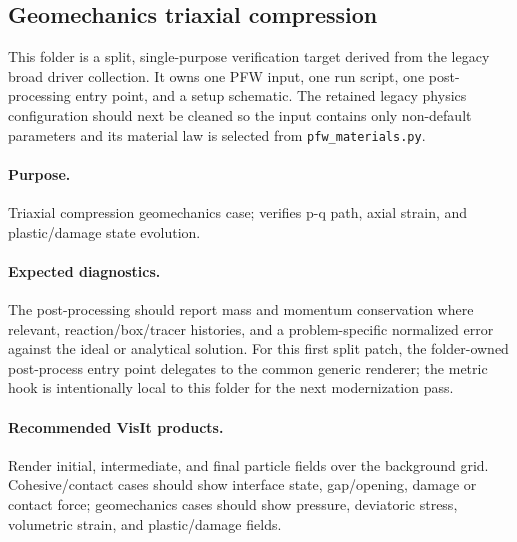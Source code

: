 \subsection{Geomechanics triaxial compression}
\label{sec:geomechanicsTriaxialCompression}

This folder is a split, single-purpose verification target derived from the
legacy broad driver collection.  It owns one PFW input, one run script, one
post-processing entry point, and a setup schematic.  The retained legacy physics
configuration should next be cleaned so the input contains only non-default
parameters and its material law is selected from \texttt{pfw\_materials.py}.

\paragraph{Purpose.} Triaxial compression geomechanics case; verifies p-q path, axial strain, and plastic/damage state evolution.

\paragraph{Expected diagnostics.} The post-processing should report mass and
momentum conservation where relevant, reaction/box/tracer histories, and a
problem-specific normalized error against the ideal or analytical solution.  For
this first split patch, the folder-owned post-process entry point delegates to
the common generic renderer; the metric hook is intentionally local to this
folder for the next modernization pass.

\paragraph{Recommended VisIt products.} Render initial, intermediate, and final
particle fields over the background grid.  Cohesive/contact cases should show
interface state, gap/opening, damage or contact force; geomechanics cases should
show pressure, deviatoric stress, volumetric strain, and plastic/damage fields.
